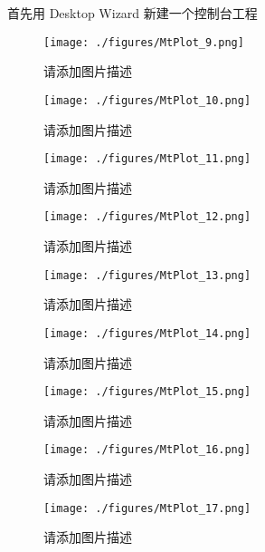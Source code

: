 首先用 Desktop Wizard 新建一个控制台工程
\begin{figure}[ht]
\centering
\texttt{[image: ./figures/MtPlot\_9.png]}
\caption{请添加图片描述} \label{MtPlot_fig9}
\end{figure}

\begin{figure}[ht]
\centering
\texttt{[image: ./figures/MtPlot\_10.png]}
\caption{请添加图片描述} \label{MtPlot_fig10}
\end{figure}

\begin{figure}[ht]
\centering
\texttt{[image: ./figures/MtPlot\_11.png]}
\caption{请添加图片描述} \label{MtPlot_fig11}
\end{figure}

\begin{figure}[ht]
\centering
\texttt{[image: ./figures/MtPlot\_12.png]}
\caption{请添加图片描述} \label{MtPlot_fig12}
\end{figure}

\begin{figure}[ht]
\centering
\texttt{[image: ./figures/MtPlot\_13.png]}
\caption{请添加图片描述} \label{MtPlot_fig13}
\end{figure}

\begin{figure}[ht]
\centering
\texttt{[image: ./figures/MtPlot\_14.png]}
\caption{请添加图片描述} \label{MtPlot_fig14}
\end{figure}

\begin{figure}[ht]
\centering
\texttt{[image: ./figures/MtPlot\_15.png]}
\caption{请添加图片描述} \label{MtPlot_fig15}
\end{figure}

\begin{figure}[ht]
\centering
\texttt{[image: ./figures/MtPlot\_16.png]}
\caption{请添加图片描述} \label{MtPlot_fig16}
\end{figure}

\begin{figure}[ht]
\centering
\texttt{[image: ./figures/MtPlot\_17.png]}
\caption{请添加图片描述} \label{MtPlot_fig17}
\end{figure}
